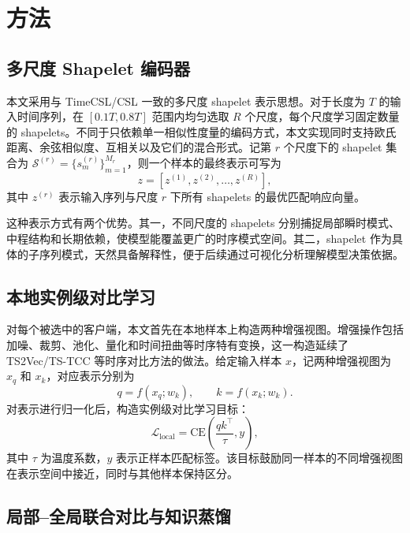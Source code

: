 \documentclass{article}
\begin{document}
\section{方法}

\subsection{多尺度 Shapelet 编码器}

本文采用与 TimeCSL/CSL 一致的多尺度 shapelet 表示思想。对于长度为 $T$ 的输入时间序列，在 $\left[0.1T,0.8T\right]$ 范围内均匀选取 $R$ 个尺度，每个尺度学习固定数量的 shapelets。不同于只依赖单一相似性度量的编码方式，本文实现同时支持欧氏距离、余弦相似度、互相关以及它们的混合形式。记第 $r$ 个尺度下的 shapelet 集合为 $\mathcal{S}^{(r)}=\{s_m^{(r)}\}_{m=1}^{M_r}$，则一个样本的最终表示可写为
\begin{equation}
z = \left[z^{(1)},z^{(2)},\dots,z^{(R)}\right],
\end{equation}
其中 $z^{(r)}$ 表示输入序列与尺度 $r$ 下所有 shapelets 的最优匹配响应向量。

这种表示方式有两个优势。其一，不同尺度的 shapelets 分别捕捉局部瞬时模式、中程结构和长期依赖，使模型能覆盖更广的时序模式空间。其二，shapelet 作为具体的子序列模式，天然具备解释性，便于后续通过可视化分析理解模型决策依据。

\subsection{本地实例级对比学习}

对每个被选中的客户端，本文首先在本地样本上构造两种增强视图。增强操作包括加噪、裁剪、池化、量化和时间扭曲等时序特有变换，这一构造延续了 TS2Vec/TS-TCC 等时序对比方法的做法\cite{ts2vec,tstcc}。给定输入样本 $x$，记两种增强视图为 $x_q$ 和 $x_k$，对应表示分别为
\begin{equation}
q = f(x_q;w_k),\qquad k = f(x_k;w_k).
\end{equation}
对表示进行归一化后，构造实例级对比学习目标：
\begin{equation}
\mathcal{L}_{\text{local}} = \mathrm{CE}\left(\frac{qk^\top}{\tau}, y\right),
\end{equation}
其中 $\tau$ 为温度系数，$y$ 表示正样本匹配标签。该目标鼓励同一样本的不同增强视图在表示空间中接近，同时与其他样本保持区分。

\subsection{局部--全局联合对比与知识蒸馏}
\end{document}
